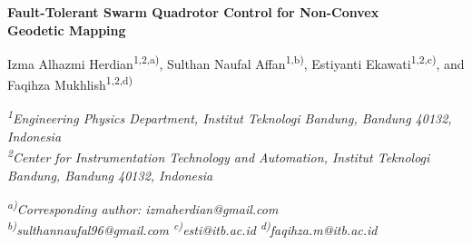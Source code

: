 \documentclass[10pt,letterpaper]{article}
\newif\ifanon
\begin{document}
\begin{center}
    {\fontsize{18}{22}\selectfont\bfseries
        Fault-Tolerant Swarm Quadrotor Control for Non-Convex\\ Geodetic Mapping\par}
    \vspace{1.6ex}
    \ifanon
        {\fontsize{14}{17}\selectfont [Author names removed for double-blind review]\par}
        \vspace{1.2ex}
        {\fontsize{10}{12}\selectfont\itshape [Affiliations and e-mail addresses removed]\par}
    \else
        {\fontsize{14}{17}\selectfont
            Izma Alhazmi Herdian\textsuperscript{1,2,a)},
            Sulthan Naufal Affan\textsuperscript{1,b)},
            Estiyanti Ekawati\textsuperscript{1,2,c)}, and
            Faqihza Mukhlish\textsuperscript{1,2,d)}\par}
        \vspace{1.2ex}
        {\fontsize{10}{12}\selectfont\itshape
            \textsuperscript{1}Engineering Physics Department, Institut Teknologi Bandung,
            Bandung 40132, Indonesia\\
            \textsuperscript{2}Center for Instrumentation Technology and Automation,
            Institut Teknologi Bandung, Bandung 40132, Indonesia\par}
        \vspace{1.2ex}
        {\fontsize{10}{12}\selectfont\itshape
            \textsuperscript{a)}Corresponding author: izmaherdian@gmail.com\\
            \textsuperscript{b)}sulthannaufal96@gmail.com\quad
            \textsuperscript{c)}esti@itb.ac.id\quad
            \textsuperscript{d)}faqihza.m@itb.ac.id\par}
    \fi
\end{center}
\end{document}
